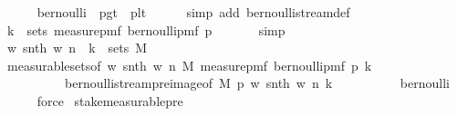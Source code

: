 \begin{isabellebody}
\ \ \ \ \isamarkupfalse%
\ bernoulli\ \ p{\isacharunderscore}{\kern0pt}gt{\isacharunderscore}{\kern0pt}{}\ \ p{\isacharunderscore}{\kern0pt}lt{\isacharunderscore}{\kern0pt}{}\isanewline
\ \ \ \ \isamarkupfalse%
\ {\isacharparenleft}{\kern0pt}simp\ add{\isacharcolon}{\kern0pt}\ bernoulli{\isacharunderscore}{\kern0pt}stream{\isacharunderscore}{\kern0pt}def{\isacharparenright}{\kern0pt}\isanewline
\ \ \isamarkupfalse%
\ \isamarkupfalse%
\ {\isachardoublequoteopen}{\isacharbraceleft}{\kern0pt}k{\isacharbraceright}{\kern0pt}\ {\isasymin}\ sets\ {\isacharparenleft}{\kern0pt}measure{\isacharunderscore}{\kern0pt}pmf\ {\isacharparenleft}{\kern0pt}bernoulli{\isacharunderscore}{\kern0pt}pmf\ p{\isacharparenright}{\kern0pt}{\isacharparenright}{\kern0pt}{\isachardoublequoteclose}\ \isanewline
\ \ \ \ \isamarkupfalse%
\ simp\isanewline
\ \ \isamarkupfalse%
\ \isamarkupfalse%
\ {\isachardoublequoteopen}{\isacharparenleft}{\kern0pt}{\isasymlambda}w{\isachardot}{\kern0pt}\ snth\ w\ n{\isacharparenright}{\kern0pt}\ {\isacharminus}{\kern0pt}{\isacharbackquote}{\kern0pt}\ {\isacharbraceleft}{\kern0pt}k{\isacharbraceright}{\kern0pt}\ {\isasymin}\ sets\ M{\isachardoublequoteclose}\ \isanewline
\ \ \ \ \isamarkupfalse%
\ measurable{\isacharunderscore}{\kern0pt}sets{\isacharbrackleft}{\kern0pt}of\ {\isachardoublequoteopen}{\isasymlambda}w{\isachardot}{\kern0pt}\ snth\ w\ n{\isachardoublequoteclose}\ M\ {\isachardoublequoteopen}measure{\isacharunderscore}{\kern0pt}pmf\ {\isacharparenleft}{\kern0pt}bernoulli{\isacharunderscore}{\kern0pt}pmf\ p{\isacharparenright}{\kern0pt}{\isachardoublequoteclose}\ {\isachardoublequoteopen}{\isacharbraceleft}{\kern0pt}k{\isacharbraceright}{\kern0pt}{\isachardoublequoteclose}{\isacharbrackright}{\kern0pt}\isanewline
\ \ \ \ \ \ \ \ \ \ bernoulli{\isacharunderscore}{\kern0pt}stream{\isacharunderscore}{\kern0pt}preimage{\isacharbrackleft}{\kern0pt}of\ M\ p\ {\isachardoublequoteopen}{\isasymlambda}w{\isachardot}{\kern0pt}\ snth\ w\ n{\isachardoublequoteclose}\ {\isachardoublequoteopen}{\isacharbraceleft}{\kern0pt}k{\isacharbraceright}{\kern0pt}{\isachardoublequoteclose}{\isacharbrackright}{\kern0pt}\isanewline
\ \ \ \ \ \ \ \ \ \ bernoulli\isanewline
\ \ \ \ \isamarkupfalse%
\ force\isanewline
{}\isamarkupfalse%
%
\endisatagproof
{\isafoldproof}%
%
\isadelimproof
\isanewline
%
\endisadelimproof
\isanewline
\isanewline
{}\isamarkupfalse%
\ stake{\isacharunderscore}{\kern0pt}measurable{\isacharunderscore}{\kern0pt}pre{}{\isacharcolon}{\kern0pt}\isanewline

\end{isabellebody}
